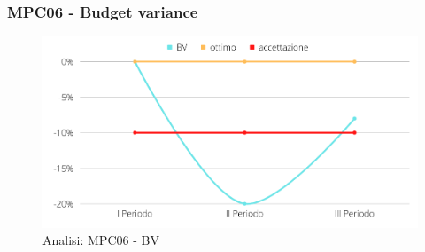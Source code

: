 \subsubsection{MPC06 - Budget variance}
\begin{figure}[H]
    \centering
    \includegraphics[scale=0.50]{Sezioni/images/analisi-BV.png}
    \caption{Analisi: MPC06 - BV}
\end{figure}

